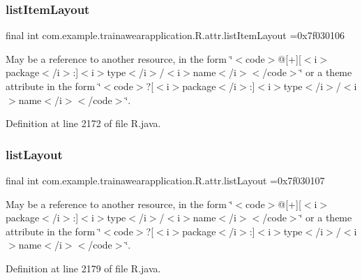 \subsubsection{\texorpdfstring{listItemLayout}{listItemLayout}}
{\footnotesize\ttfamily final int com.\+example.\+trainawearapplication.\+R.\+attr.\+list\+Item\+Layout =0x7f030106\hspace{0.3cm}{\ttfamily [static]}}

May be a reference to another resource, in the form \char`\"{}$<$code$>$@\mbox{[}+\mbox{]}\mbox{[}$<$i$>$package$<$/i$>$\+:\mbox{]}$<$i$>$type$<$/i$>$/$<$i$>$name$<$/i$>$$<$/code$>$\char`\"{} or a theme attribute in the form \char`\"{}$<$code$>$?\mbox{[}$<$i$>$package$<$/i$>$\+:\mbox{]}$<$i$>$type$<$/i$>$/$<$i$>$name$<$/i$>$$<$/code$>$\char`\"{}. 

Definition at line 2172 of file R.\+java.

\mbox{\label{classcom_1_1example_1_1trainawearapplication_1_1_r_1_1attr_aa0da0cde08a5d41852489f527cc30824}} 
\subsubsection{\texorpdfstring{listLayout}{listLayout}}
{\footnotesize\ttfamily final int com.\+example.\+trainawearapplication.\+R.\+attr.\+list\+Layout =0x7f030107\hspace{0.3cm}{\ttfamily [static]}}

May be a reference to another resource, in the form \char`\"{}$<$code$>$@\mbox{[}+\mbox{]}\mbox{[}$<$i$>$package$<$/i$>$\+:\mbox{]}$<$i$>$type$<$/i$>$/$<$i$>$name$<$/i$>$$<$/code$>$\char`\"{} or a theme attribute in the form \char`\"{}$<$code$>$?\mbox{[}$<$i$>$package$<$/i$>$\+:\mbox{]}$<$i$>$type$<$/i$>$/$<$i$>$name$<$/i$>$$<$/code$>$\char`\"{}. 

Definition at line 2179 of file R.\+java.

\mbox{\label{classcom_1_1example_1_1trainawearapplication_1_1_r_1_1attr_a715fc79a00526bee101e986858320b68}} 
